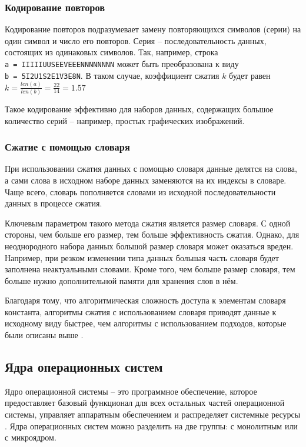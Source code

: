 \subsubsection{Кодирование повторов} 

Кодирование повторов подразумевает замену повторяющихся символов (серии) на один символ и число его повторов. Серия -- последовательность данных, состоящих из одинаковых символов. Так, например, строка \\\texttt{a = IIIIIUUSEEVEEENNNNNNNN} может быть преобразована к виду \\\texttt{b = 5I2U1S2E1V3E8N}. В таком случае, коэффициент сжатия $k$ будет равен $k = \frac{len(a)}{len(b)} = \frac{22}{14} = 1.57$

Такое кодирование эффективно для наборов данных, содержащих большое количество серий -- например, простых графических изображений. 

\subsubsection{Сжатие с помощью словаря}

При использовании сжатия данных с помощью словаря данные делятся на слова, а сами слова в исходном наборе данных заменяются на их индексы в словаре. Чаще всего, словарь пополняется словами из исходной последовательности данных в процессе сжатия. 

Ключевым параметром такого метода сжатия является размер словаря. С одной стороны, чем больше его размер, тем больше эффективность сжатия. Однако, для неоднородного набора данных большой размер словаря может оказаться вреден. Например, при резком изменении типа данных большая часть словаря будет заполнена неактуальными словами. Кроме того, чем больше размер словаря, тем больше нужно дополнительной памяти для хранения слов в нём. 

Благодаря тому, что алгоритмическая сложность доступа к элементам словаря константа, алгоритмы сжатия с использованием словаря приводят данные к исходному виду быстрее, чем алгоритмы с использованием подходов, которые были описаны выше \cite{lossless-compression}.

\subsection{Ядра операционных систем}

Ядро операционной системы -- это программное обеспечение, которое предоставляет базовый функционал для всех остальных частей операционной системы, управляет аппаратным обеспечением и распределяет системные ресурсы \cite{kernel-development}. Ядра операционных систем можно разделить на две группы: с монолитным или с микроядром.

